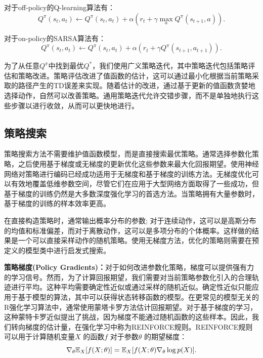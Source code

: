 对于off-policy的Q-learning算法有：
\begin{equation}
Q^{\pi}(s_t, a_t) \leftarrow Q^{\pi}(s_t, a_t) + \alpha (r_t + \gamma \max_a Q^{\pi}(s_{t+1}, a)).
\end{equation}

对于on-policy的SARSA算法有：
\begin{equation}
Q^{\pi}(s_t, a_t) \leftarrow Q^{\pi}(s_t, a_t) + \alpha (r_t + \gamma Q^{\pi}(s_{t+1}, a_{t+1})).
\end{equation}

为了从任意$Q^\pi$中找到最优$Q^*$，我们使用广义策略迭代，其中策略迭代包括策略评估和策略改进。策略评估改进了值函数的估计，这可以通过最小化根据当前策略采取的路径产生的TD误差来实现。随着估计的改进，通过基于更新的值函数贪婪地选择动作，自然可以改善策略。通用策略迭代允许交错步骤，而不是单独地执行这些步骤以进行收敛，从而可以更快地进行。

\subsection{策略搜索}
策略搜索方法不需要维护值函数模型，而是直接搜索最优策略。通常选择参数化策略，之后使用基于梯度或无梯度的更新优化这些参数来最大化回报期望。使用神经网络对策略进行编码已经成功适用于无梯度和基于梯度的训练方法。无梯度优化可以有效地覆盖低维参数空间，尽管它们在应用于大型网络方面取得了一些成功\cite{21}，但基于梯度的训练仍然是大多数深度强化学习的首选方法。当策略拥有大量参数时，基于梯度的训练的样本效率更高。

在直接构造策略时，通常输出概率分布的参数; 对于连续动作，这可以是高斯分布的均值和标准偏差，而对于离散动作，这可以是多项分布的个体概率。这样做的结果是一个可以直接采样动作的随机策略。使用无梯度方法，优化的策略则需要在预定义的模型类中进行启发式搜索。

\textbf{策略梯度(Policy Gradients)：}对于如何改进参数化策略，梯度可以提供强有力的学习信号。然而，为了计算回报期望，我们需要对当前策略参数化引入的合理轨迹进行平均。这种平均需要确定性近似或通过采样的随机近似\cite{22}。确定性近似只能应用于基于模型的算法，其中可以获得状态转移函数的模型。在更常见的模型无关的R强化学习算法中，通常使用蒙塔卡罗方法估计回报期望。对于基于梯度的学习，这种蒙特卡罗近似提出了挑战，因为梯度不能通过随机函数的这些样本。因此，我们转向梯度的估计量，在强化学习中称为REINFORCE规则\cite{23}。REINFORCE规则可以用于计算随机变量$X$ 的函数$f$ 对于参数$\theta$ 的期望梯度：
\begin{equation}
\nabla_\theta \Bbb{E}_X [f(X;\theta)] = \Bbb{E}_X [f(X;\theta) \nabla_\theta \log p(X)].
\end{equation}

